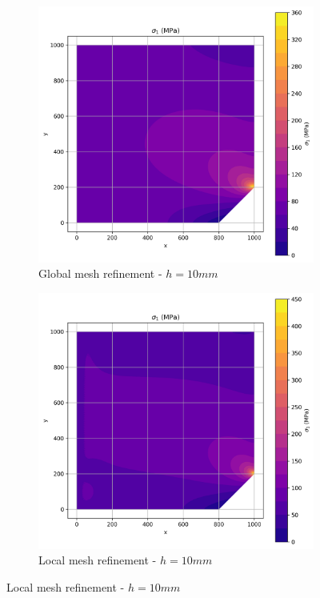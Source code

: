 \begin{figure}[H]
  \centering
  \begin{subfigure}[b]{0.45\textwidth}
    \centering
    \includegraphics[width=\textwidth]{GRAFICOS/Quad9/1.25mm_global/resultados - sigma_1.png}
    \caption{Global mesh refinement - $h=10mm$}
    \label{fig:img13}
  \end{subfigure}
  \hfill
  \begin{subfigure}[b]{0.45\textwidth}
    \centering
    \includegraphics[width=\textwidth]{GRAFICOS/Quad9/1.25mm_local/resultados - sigma_1.png}
    \caption{Local mesh refinement - $h=10mm$}
    \label{fig:img23}
  \end{subfigure}
\end{figure}

